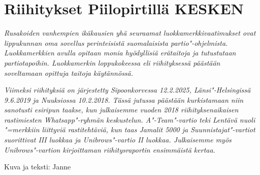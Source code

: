 \section{Riihitykset Piilopirtillä KESKEN}

\textit{Rusakoiden vanhempien ikäkausien yhä seuraamat 
luokkamerkkivaatimukset ovat lippukunnan oma sovellus perinteisistä 
suomalaisista partio"-ohjelmista. Luokkamerkkien avulla opitaan monia 
hyödyllisiä erätaitoja ja tutustutaan partiotapoihin. Luokkamerkin 
loppukokeessa eli riihityksessä päästään soveltamaan opittuja taitoja 
käytännössä.}

\textit{Viimeksi riihityksiä on järjestetty Sipoonkorvessa 12.2.2025, 
Länsi"-Helsingissä 9.6.2019 ja Nuuksiossa 10.2.2018. Tässä jutussa 
päästään kurkistamaan niin sanotusti esiripun taakse, kun julkaisemme 
vuoden 2018 riihityksenaikaisen rastimiesten Whatsapp"-ryhmän keskustelun. 
A"-Team"-vartio teki Lentävä nuoli "=merkkiin liittyviä rastitehtäviä, kun 
taas Jamalit 5000 ja Suunnistajat"-vartiot suorittivat III luokkaa ja 
Unibrows"-vartio II luokkaa. Julkaisemme myös Unibrows"-vartion kirjoittaman 
riihitysraportin ensimmäistä kertaa.}

\medskip

\noindent\null\hfill Kuva ja teksti: Janne

